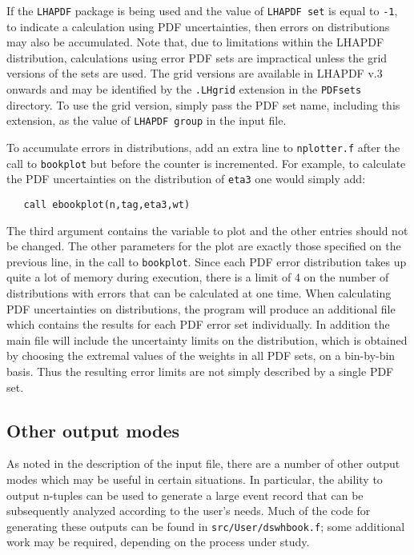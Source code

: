 \documentclass[12pt]{article}
\begin{document}
If the {\tt LHAPDF} package is being used and the value of
{\tt LHAPDF set} is equal to {\tt -1},  to indicate a calculation using
PDF uncertainties, then errors on distributions may also be accumulated.
Note that, due to limitations within the LHAPDF distribution, calculations
using error PDF sets are impractical unless the grid versions of the sets
are used. The grid versions are available in LHAPDF v.3 onwards and may be identified
by the {\tt .LHgrid} extension in the {\tt PDFsets} directory. To use the
grid version, simply pass the PDF set name, including this extension, as
the value of {\tt LHAPDF group} in the input file.
 
To accumulate errors in distributions, add an extra
line to {\tt nplotter.f} after the
call to {\tt bookplot} but before the counter is incremented. For
example, to calculate the PDF uncertainties on the distribution
of {\tt eta3} one would simply add:
\begin{verbatim}
   call ebookplot(n,tag,eta3,wt)
\end{verbatim}
The third argument contains the variable to plot and the other entries
should not be changed. The other parameters for the plot are exactly
those specified on the previous line, in the call to {\tt bookplot}.
Since each PDF error distribution takes up quite a lot of memory
during execution, there is a limit of 4 on the number of distributions
with errors that can be calculated at one time. When calculating
PDF uncertainties on distributions, the program will produce an
additional file which contains the results for each PDF error set
individually. In addition the main file will include the uncertainty
limits on the distribution, which is obtained by choosing the extremal
values of the weights in all PDF sets, on a bin-by-bin basis. Thus
the resulting error limits are not simply described by a single PDF
set.

\subsection{Other output modes}
\label{subsec:otheroutput}
As noted in the description of the input file, there are a number of other
output modes which may be useful in certain situations. In particular, the
ability to output n-tuples can be used to generate a large event record that 
can be subsequently analyzed according to the user's needs. Much of the code
for generating these outputs can be found in {\tt src/User/dswhbook.f}; some
additional work may be required, depending on the process under study.
\end{document}
